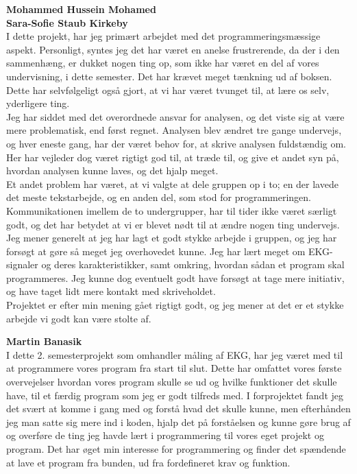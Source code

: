 \textbf{Mohammed Hussein Mohamed}\\

\textbf{Sara-Sofie Staub Kirkeby}\\
I dette projekt, har jeg primært arbejdet med det programmeringsmæssige aspekt. Personligt, syntes jeg det har været en anelse frustrerende, da der i den sammenhæng, er dukket nogen ting op, som ikke har været en del af vores undervisning, i dette semester. Det har krævet meget tænkning ud af boksen. Dette har selvfølgeligt også gjort, at vi har været tvunget til, at lære os selv, yderligere ting. \\
Jeg har siddet med det overordnede ansvar for analysen, og det viste sig at være mere problematisk, end først regnet. Analysen blev ændret tre gange undervejs, og hver eneste gang, har der været behov for, at skrive analysen fuldstændig om. Her har vejleder dog været rigtigt god til, at træde til, og give et andet syn på, hvordan analysen kunne laves, og det hjalp meget.\\ 
Et andet problem har været, at vi valgte at dele gruppen op i to; en der lavede det meste tekstarbejde, og en anden del, som stod for programmeringen. Kommunikationen imellem de to undergrupper, har til tider ikke været særligt godt, og det har betydet at vi er blevet nødt til at ændre nogen ting undervejs. \\
Jeg mener generelt at jeg har lagt et godt stykke arbejde i gruppen, og jeg har forsøgt at gøre så meget jeg overhovedet kunne. Jeg har lært meget om EKG-signaler og deres karakteristikker, samt omkring, hvordan sådan et program skal programmeres. Jeg kunne dog eventuelt godt have forsøgt at tage mere initiativ, og have taget lidt mere kontakt med skriveholdet. \\
Projektet er efter min mening gået rigtigt godt, og jeg mener at det er et stykke arbejde vi godt kan være stolte af.

\textbf{Martin Banasik}\\
I dette 2. semesterprojekt som omhandler måling af EKG, har jeg været med til at programmere vores program fra start til slut. Dette har omfattet vores første overvejelser hvordan vores program skulle se ud og hvilke funktioner det skulle have, til et færdig program som jeg er godt tilfreds med. I forprojektet fandt jeg det svært at komme i gang med og forstå hvad det skulle kunne, men efterhånden jeg man satte sig mere ind i koden, hjalp det på forståelsen og kunne gøre brug af og overføre de ting jeg havde lært i programmering til vores eget projekt og program. Det har øget min interesse for programmering og finder det spændende at lave et program fra bunden, ud fra fordefineret krav og funktion. 

